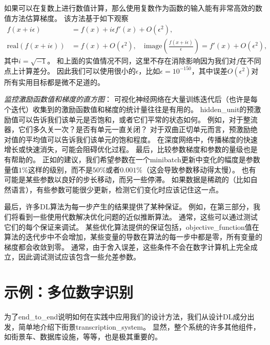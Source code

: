 
如果可以在复数上进行数值计算，那么使用复数作为函数的输入能有非常高效的数值方法估算梯度\citep{Squire+Trapp-1998}。
该方法基于如下观察
\begin{align}
	f(x + i\epsilon) &= f(x) + i\epsilon f'(x) + O(\epsilon^2) ,\\
	\text{real}( f(x+i\epsilon) ) &= f(x) + O(\epsilon^2), \quad \text{image}( \frac{f(x+i\epsilon)}{ \epsilon } ) = f'(x) + O(\epsilon^2),
\end{align}
其中$i=\sqrt{-1}$。
和上面的实值情况不同，这里不存在消除影响因为我们对$f$在不同点上计算差分。
因此我们可以使用很小的$\epsilon$，比如$\epsilon = 10^{-150}$，其中误差$O(\epsilon^2)$对所有实用目标都是微不足道的。


\emph{监控激励函数值和梯度的直方图}：
可视化神经网络在大量训练迭代后（也许是每个迭代）收集到的激励函数值和梯度的统计量往往是有用的。
\gls{hidden_unit}的预激励值可以告诉我们该单元是否饱和，或者它们平常的状态如何。
例如，对于整流器，它们多久关一次？是否有单元一直关闭？
对于双曲正切单元而言，预激励绝对值的平均值可以告诉我们该单元的饱和程度。
在深度网络中，传播梯度的快速增长或快速消失，可能会阻碍优化过程。
最后，比较参数梯度和参数的量级也是有帮助的。
正如\citep{Bottou-DLSS2015}的建议，我们希望参数在一个\gls{minibatch}更新中变化的幅度是参数量值$1\%$这样的级别，而不是$50\%$或者$0.001\%$（这会导致参数移动得太慢）。
也有可能是某些参数以良好的步长移动，而另一些停滞。
如果数据是稀疏的（比如自然语言），有些参数可能很少更新，检测它们变化时应该记住这一点。


最后，许多\gls{DL}算法为每一步产生的结果提供了某种保证。
例如，在第三部分，我们将看到一些使用代数解决优化问题的近似推断算法。
通常，这些可以通过测试它们的每个保证来调试。
某些优化算法提供的保证包括，\gls{objective_function}值在算法的迭代步中不会增加，某些变量的导数在算法的每一步中都是零，所有变量的梯度都会收敛到零。
通常，由于舍入误差，这些条件不会在数字计算机上完全成立，因此调试测试应该包含一些允差参数。


\section{示例：多位数字识别}
\label{sec:example_multi_digit_number_recognition}
为了\gls{end_to_end}说明如何在实践中应用我们的设计方法，我们从设计\gls{DL}成分出发，简单地介绍下街景\gls{transcription_system}。
显然，整个系统的许多其他组件，如街景车、数据库设施，等等，也是极其重要的。

